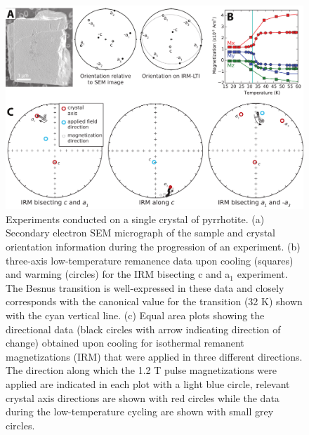 \documentclass[draft,gc]{AGUTeX}
\begin{document}
\begin{figure}
\noindent\includegraphics[width=\textwidth]{Pyrrhotite1.pdf}
\caption{Experiments conducted on a single crystal of pyrrhotite. (a) Secondary electron SEM micrograph of the sample and crystal orientation information during the progression of an experiment. (b) three-axis low-temperature remanence data upon cooling (squares) and warming (circles) for the IRM bisecting c and a$_1$ experiment. The Besnus transition is well-expressed in these data and closely corresponds with the canonical value for the transition (32 K) shown with the cyan vertical line. (c) Equal area plots showing the directional data (black circles with arrow indicating direction of change) obtained upon cooling for isothermal remanent magnetizations (IRM) that were applied in three different directions. The direction along which the 1.2 T pulse magnetizations were applied are indicated in each plot with a light blue circle, relevant crystal axis directions are shown with red circles while the data during the low-temperature cycling are shown with small grey circles.}
\label{fig:pyrrhotite}
\end{figure}
\end{document}
